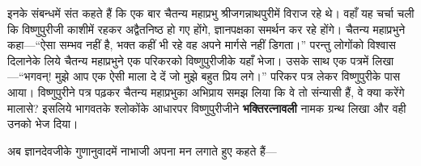 \begin{sloppypar}\justifying{}
इनके संबन्धमें संत कहते हैं कि एक बार चैतन्य महाप्रभु श्रीजगन्नाथ\-पुरीमें विराज रहे थे। वहाँ यह चर्चा चली कि विष्णुपुरीजी काशीमें रहकर अद्वैतनिष्ठ हो गए होंगे, ज्ञानपक्षका समर्थन कर रहे होंगे। चैतन्य महाप्रभुने कहा—“ऐसा सम्भव नहीं है, भक्त कहीं भी रहे वह अपने मार्गसे नहीं डिगता।” परन्तु लोगोंको विश्वास दिलानेके लिये चैतन्य महाप्रभुने एक परिकरको विष्णुपुरीजीके यहाँ भेजा। उसके साथ एक पत्रमें लिखा—“भगवन्! मुझे आप एक ऐसी माला दे दें जो मुझे बहुत प्रिय लगे।” परिकर पत्र लेकर विष्णुपुरीके पास आया। विष्णुपुरीने पत्र पढ़कर चैतन्य महाप्रभुका अभिप्राय समझ लिया कि वे तो संन्यासी हैं, वे क्या करेंगे मालासे? इसलिये भागवतके श्लोकोंके आधारपर विष्णुपुरीजीने \textbf{भक्तिरत्नावली} नामक ग्रन्थ लिखा और वही उनको भेज दिया।
\end{sloppypar}
\begin{sloppypar}\justifying{}
अब ज्ञानदेवजीके गुणानुवादमें नाभाजी अपना मन लगाते हुए कहते हैं—
\end{sloppypar}


